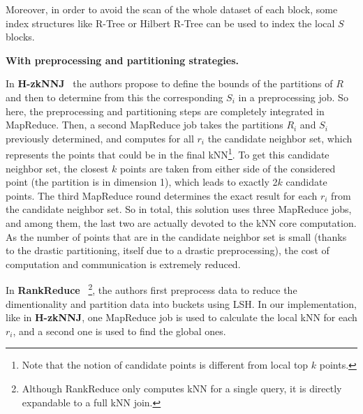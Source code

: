 \documentclass[10pt,journal,compsoc]{IEEEtran}
\newcommand{\Z}{{\bf H-zkNNJ}}
\newcommand{\LSH}{{\bf RankReduce}}
\begin{document}
 Moreover, in order to avoid the scan of the whole dataset of each block, some index structures like R-Tree \cite{Zhang:2012:EPK:2247596.2247602} or Hilbert R-Tree \cite{6967143} can be used to index the local $S$ blocks. 

\vspace{0.3em}

\noindent \textbf{With preprocessing and partitioning strategies.} 


\noindent
In \Z~ \cite{Zhang:2012:EPK:2247596.2247602} the authors propose  to define the bounds of the partitions of $R$ and then to determine from this the 
corresponding $S_i$ in a preprocessing job. So here, the preprocessing and partitioning steps are completely integrated in MapReduce. Then, a 
second MapReduce job takes the partitions $R_i$ and $S_i$ previously determined, and computes for all $r_i$ the candidate neighbor set, which 
represents the points that could be in the final kNN\footnote{Note that the notion of candidate points is different from local top $k$ points.}.
To get this candidate neighbor set, the closest $k$ points are taken from either side of the considered point (the partition is in dimension 1), which leads to exactly 2$k$ candidate points.
The third MapReduce round determines the exact result for each $r_i$ from the candidate neighbor set.
So in total, this solution uses three MapReduce jobs, and among them, the last two are actually devoted to the kNN core 
computation. As the number of points that are in the candidate neighbor set is small (thanks to the drastic 
partitioning, itself due to a drastic preprocessing), the cost of computation and communication is extremely reduced.

In \LSH~ \cite{Stupar10rankreduce-}\footnote{Although RankReduce only computes kNN for a single query, it is 
directly expandable to a full kNN join.}, the authors first preprocess  data to reduce the dimentionality and partition data into buckets 
using LSH. In our implementation, like in \Z,  one MapReduce job is used to calculate the local kNN for each $r_i$, and 
a second one is used to find the global ones.

%
\end{document}
